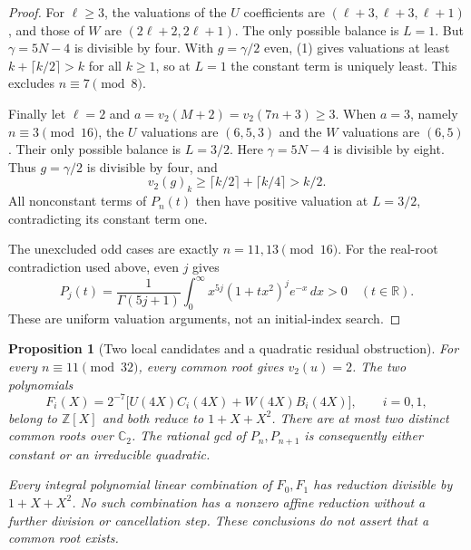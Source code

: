 \documentclass[11pt]{article}
\newtheorem{proposition}[lemma]{Proposition}
\begin{document}
\begin{proof}
For $\ell\ge3$, the valuations of the $U$ coefficients are
$(\ell+3,\ell+3,\ell+1)$, and those of $W$ are
$(2\ell+2,2\ell+1)$. The only possible balance is $L=1$.
But $\gamma=5N-4$ is divisible by four. With $g=\gamma/2$
even, (1) gives valuations at least $k+\lceil k/2\rceil>k$
for all $k\ge1$, so at $L=1$ the constant term is uniquely least.
This excludes $n\equiv7\pmod8$.

Finally let $\ell=2$ and $a=v_2(M+2)=v_2(7n+3)\ge3$.
When $a=3$, namely $n\equiv3\pmod{16}$, the $U$ valuations
are $(6,5,3)$ and the $W$ valuations are $(6,5)$.
Their only possible balance is $L=3/2$.
Here $\gamma=5N-4$ is divisible by eight. Thus $g=\gamma/2$
is divisible by four, and
\[
 v_2(g)_k\ge\lceil k/2\rceil+\lceil k/4\rceil>k/2.
\]
All nonconstant terms of $P_n(t)$ then have positive valuation
at $L=3/2$, contradicting its constant term one.

The unexcluded odd cases are exactly $n=11,13\pmod{16}$.
For the real-root contradiction used above, even $j$ gives
\[
 P_j(t)=\frac1{\Gamma(5j+1)}
 \int_0^\infty x^{5j}(1+tx^2)^j e^{-x}\,dx>0
 \quad(t\in\mathbb R).
\]
These are uniform valuation arguments, not an initial-index search.
\end{proof}
\begin{proposition}[Two local candidates and a quadratic residual obstruction]
\label{prop:quadratic-obstruction}
For every $n\equiv11\pmod{32}$, every common root gives $v_2(u)=2$.
The two polynomials
\[
 F_i(X)=2^{-7}\bigl[U(4X)C_i(4X)+W(4X)B_i(4X)\bigr],
 \qquad i=0,1,
\]
belong to $\mathbb Z[X]$ and both reduce to $1+X+X^2$.
There are at most two distinct common roots over $\mathbb C_2$.
The rational gcd of $P_n,P_{n+1}$ is consequently either constant
or an irreducible quadratic.

Every integral polynomial linear combination of $F_0,F_1$ has
reduction divisible by $1+X+X^2$. No such combination has a nonzero
affine reduction without a further division or cancellation step.
These conclusions do not assert that a common root exists.
\end{proposition}
\end{document}
